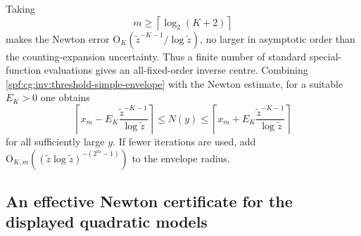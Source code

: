 \documentclass[11pt]{article}
\numberwithin{equation}{section}
\theoremstyle{definition}
\theoremstyle{remark}
\theoremstyle{definition}
\newcommand{\bigO}{\mathrm O}
\begin{document}
Taking
\[
 m\geq\left\lceil\log_2(K+2)\right\rceil
\]
makes the Newton error $\bigO_K(\tilde z^{-K-1}/\log\tilde z)$, no larger in
asymptotic order than the counting-expansion uncertainty. Thus a finite
number of standard special-function evaluations gives an all-fixed-order
inverse centre. Combining \eqref{spf:cg:inv:threshold-simple-envelope} with the
Newton estimate, for a suitable $E_K>0$ one obtains
\begin{equation}
 \left\lceil x_m-E_K\frac{\tilde z^{-K-1}}{\log\tilde z}\right\rceil
 \leq N(y)\leq
 \left\lceil x_m+E_K\frac{\tilde z^{-K-1}}{\log\tilde z}\right\rceil
 \label{spf:cg:inv:Newton-threshold}
\end{equation}
for all sufficiently large $y$. If fewer iterations are used, add
$\bigO_{K,m}((\tilde z\log\tilde z)^{-(2^m-1)})$ to the envelope radius.

\subsection{An effective Newton certificate for the displayed quadratic models}
\end{document}
